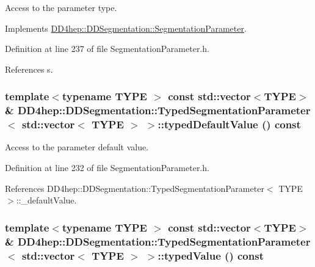 Access to the parameter type. 

Implements \hyperlink{class_d_d4hep_1_1_d_d_segmentation_1_1_segmentation_parameter_a761f142a3d6d7ecdbc200e97913af165}{DD4hep::DDSegmentation::SegmentationParameter}.

Definition at line 237 of file SegmentationParameter.h.

References s.\hypertarget{class_d_d4hep_1_1_d_d_segmentation_1_1_typed_segmentation_parameter_3_01std_1_1vector_3_01_t_y_p_e_01_4_01_4_a65101cc060d43531b3db64c2e959e93e}{
\subsubsection[{typedDefaultValue}]{\setlength{\rightskip}{0pt plus 5cm}template$<$typename TYPE $>$ const std::vector$<$TYPE$>$\& {\bf DD4hep::DDSegmentation::TypedSegmentationParameter}$<$ std::vector$<$ TYPE $>$ $>$::typedDefaultValue () const}}
\label{class_d_d4hep_1_1_d_d_segmentation_1_1_typed_segmentation_parameter_3_01std_1_1vector_3_01_t_y_p_e_01_4_01_4_a65101cc060d43531b3db64c2e959e93e}


Access to the parameter default value. 

Definition at line 232 of file SegmentationParameter.h.

References DD4hep::DDSegmentation::TypedSegmentationParameter$<$ TYPE $>$::\_\-defaultValue.\hypertarget{class_d_d4hep_1_1_d_d_segmentation_1_1_typed_segmentation_parameter_3_01std_1_1vector_3_01_t_y_p_e_01_4_01_4_a484ad3acbc0f3af176751bfac375ad42}{
\subsubsection[{typedValue}]{\setlength{\rightskip}{0pt plus 5cm}template$<$typename TYPE $>$ const std::vector$<$TYPE$>$\& {\bf DD4hep::DDSegmentation::TypedSegmentationParameter}$<$ std::vector$<$ TYPE $>$ $>$::typedValue () const}}
\label{class_d_d4hep_1_1_d_d_segmentation_1_1_typed_segmentation_parameter_3_01std_1_1vector_3_01_t_y_p_e_01_4_01_4_a484ad3acbc0f3af176751bfac375ad42}



